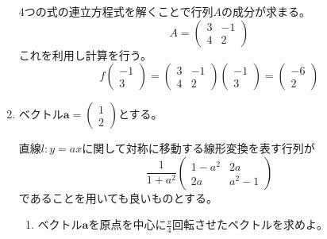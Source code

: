 \documentclass[10pt,b5paper]{ltjsarticle}
\begin{document}
\begin{enumerate}
      4つの式の連立方程式を解くことで行列$A$の成分が求まる。
      \begin{equation}
       A =
              \left(\begin{matrix}3&-1\\4&2\end{matrix}\right)
      \end{equation}
      これを利用し計算を行う。
      \begin{equation}
       f\left(\begin{matrix}-1\\3\end{matrix}\right)
       =\left(\begin{matrix}3&-1\\4&2\end{matrix}\right)
       \left(\begin{matrix}-1\\3\end{matrix}\right)
       =\left(\begin{matrix}-6\\2\end{matrix}\right)
      \end{equation}

 \item
      ベクトル$\bm{a}=\left(\begin{matrix}1\\2\end{matrix}\right)$とする。

      直線$l:y=ax$に関して対称に移動する線形変換を表す行列が
      \begin{equation}
        \frac{1}{1+a^2}\left(\begin{matrix}1-a^2 & 2a\\2a&a^2-1\end{matrix}\right)
      \end{equation}
      であることを用いても良いものとする。

      \begin{enumerate}
       \item ベクトル$\bm{a}$を原点を中心に$\frac{\pi}{4}$回転させたベクトルを求めよ。


\end{enumerate}
\end{enumerate}
\end{document}
